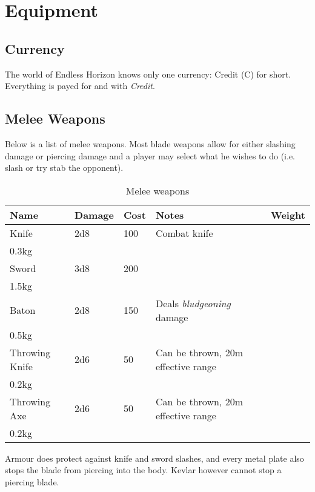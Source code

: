 \chapter{Equipment}

\section{Currency}

The world of Endless Horizon knows only one currency: Credit (C) for short.
Everything is payed for and with \emph{Credit}.

\section{Melee Weapons}

Below is a list of melee weapons. Most blade weapons allow for either slashing
damage or piercing damage and a player may select what he wishes to do (i.e.
slash or try stab the opponent).

\begin{table}
  \label{tab:Melee}
  \caption{Melee weapons}
  \begin{center}
    \begin{tabular}{| l | l | l | l | l |}
      \hline
      \textbf{Name} & \textbf{Damage} & \textbf{Cost} &
      \textbf{Notes} & \textbf{Weight} \\ \hline

      Knife & 2d8 & 100 & Combat knife \\ 0.3kg \\ \hline
      Sword & 3d8 & 200 & \\ 1.5kg \\ \hline
      Baton & 2d8 & 150 & Deals \emph{bludgeoning} damage \\ 0.5kg \\ \hline

      Throwing Knife & 2d6 & 50 & Can be thrown, 20m effective range \\ 0.2kg \\ \hline
      Throwing Axe   & 2d6 & 50 & Can be thrown, 20m effective range \\ 0.2kg \\ \hline

    \end{tabular}
  \end{center}
\end{table}

Armour does protect against knife and sword slashes, and every metal plate
also stops the blade from piercing into the body. Kevlar however cannot stop
a piercing blade.

